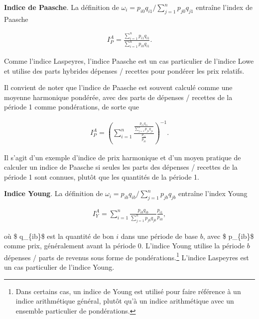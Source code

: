 \documentclass[
]{article}
\begin{document}
\textbf{Indice de Paasche}. La définition de \(\omega_{i} = p_{i0} q_{i1} / \sum_{j = 1}^{n} p_{j0} q_{j1}\) entraîne l'index de Paasche

\begin{align*}
I^{A}_{P} = \frac{\sum_{i = 1}^{n} p_{i1} q_{i1}}{\sum_{i = 1}^{n} p_{i0} q_{i1}}.
\end{align*}

Comme l'indice Laspeyres, l'indice Paasche est un cas particulier de l'indice Lowe et utilise des parts hybrides dépenses / recettes pour pondérer les prix relatifs.

Il convient de noter que l'indice de Paasche est souvent calculé comme une moyenne harmonique pondérée, avec des parts de dépenses / recettes de la période 1 comme pondérations, de sorte que

\begin{align*}
I^{A}_{P} = \left (\sum_{i = 1}^{n} \frac{\frac{p_{i1} q_{i1}}{\sum_{j = 1}^{n} p_{j1} q_{j1}}}{\frac{p_{i1}}{p_{i0}}} \right)^{- 1}.
\end{align*}

Il s'agit d'un exemple d'indice de prix harmonique et d'un moyen pratique de calculer un indice de Paasche si seules les parts des dépenses / recettes de la période 1 sont connues, plutôt que les quantités de la période 1.

\textbf{Indice Young}. La définition de \(\omega_{i} = p_{ib} q_{ib} / \sum_{j = 1}^{n} p_{jb} q_{jb}\) entraîne l'index Young

\begin{align*}
I^{A}_{Y} = \sum_{i = 1}^{n} \frac{p_{ib} q_{ib}}{\sum_{j = 1}^{n} p_{jb} q_{jb}} \frac{p_{i1}}{p_{i0}},
\end{align*}

où \$ q\_\{ib\}\$ est la quantité de bon \(i\) dans une période de base \(b\), avec \$ p\_\{ib\}\$ comme prix, généralement avant la période 0. L'indice Young utilise la période \(b\) dépenses / parts de revenus sous forme de pondérations.\footnote{Dans certains cas, un indice de Young est utilisé pour faire référence à un indice arithmétique général, plutôt qu'à un indice arithmétique avec un ensemble particulier de pondérations.} L'indice Laspeyres est un cas particulier de l'indice Young.
\end{document}
